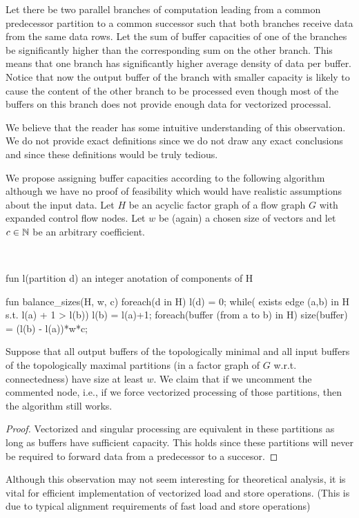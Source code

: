 \begin{observation}
  Let there be two parallel branches of computation leading from a common predecessor partition to a common successor such that both branches receive data from the same data rows. Let the sum of buffer capacities of one of the branches be significantly higher than the corresponding sum on the other branch. This means that one branch has significantly higher average density of data per buffer. Notice that now the output buffer of the branch with smaller capacity is likely to cause the content of the other branch to be processed even though most of the buffers on this branch does not provide enough data for vectorized processal.
\end{observation}

We believe that the reader has some intuitive understanding of this observation. We do not provide exact definitions since we do not draw any exact conclusions and since these definitions would be truly tedious.


We propose assigning buffer capacities according to the following algorithm although we have no proof of feasibility which would have realistic assumptions about the input data. Let $H$ be an acyclic factor graph of a flow graph $G$ with expanded control flow nodes. Let $w$ be (again) a chosen size of vectors and let $c \in \mathbb{N}$ be an arbitrary coefficient.

\ 
\begin{samepage}
\begin{code}
fun l(partition d) { an integer anotation of components of H}

fun balance_sizes(H, w, c)
{
  foreach(d in H)
    l(d) = 0;
  while( exists edge (a,b) in H s.t. l(a) + 1 > l(b))
    l(b) = l(a)+1;
  foreach(buffer (from a to b) in H)
  {
    size(buffer) = (l(b) - l(a))*w*c;
  }
}
\end{code}
\end{samepage}
\myendalg

  Suppose that all output buffers of the topologically minimal and all input buffers of the topologically maximal partitions (in a factor graph of $G$ w.r.t. connectedness) have size at least $w$. We claim that if we uncomment the commented node, i.e., if we force vectorized processing of those partitions, then the algorithm still works.
  \begin{proof}
    Vectorized and singular processing are equivalent in these partitions as long as buffers have sufficient capacity. This holds since these partitions will never be required to forward data from a predecessor to a succesor. 
  \end{proof}
\myendobs

\begin{rem} 
  Although this observation may not seem interesting for theoretical analysis, it is vital for efficient implementation of vectorized load and store operations. (This is due to typical alignment requirements of fast load and store operations)
\end{rem}

